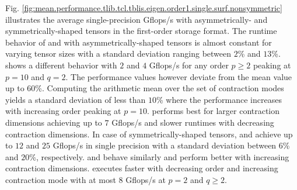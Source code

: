 Fig. \ref{fig:mean.performance.tlib.tcl.tblis.eigen.order1.single.surf.nonsymmetric} illustrates the average single-precision Gflops/s with asymmetrically- and symmetrically-shaped tensors in the first-order storage format.
The runtime behavior of  and  with asymmetrically-shaped tensors is almost constant for varying tensor sizes with a standard deviation ranging between $2$\% and $13$\%.
 shows a different behavior with $2$ and $4$ Gflops/s for any order $p\geq 2$ peaking at $p = 10$ and $q=2$.
The performance values however deviate from the mean value up to $60$\%.
Computing the arithmetic mean over the set of contraction modes yields a standard deviation of less than $10$\% where the performance increases with increasing order peaking at $p = 10$.
 performs best for larger contraction dimensions achieving up to $7$ Gflops/s and slower runtimes with decreasing contraction dimensions.
In case of symmetrically-shaped tensors,  and  achieve up to $12$ and $25$ Gflops/s in single precision with a standard deviation between $6$\% and $20$\%, respectively.
 and  behave similarly and perform better with increasing contraction dimensions. 
 executes faster with decreasing order and increasing contraction mode with at most $8$ Gflops/s at $p=2$ and $q\geq 2$.



